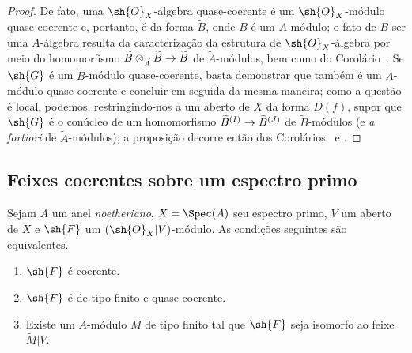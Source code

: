 \documentclass[oneside]{amsart}
\makeatletter
\newcommand{\ega@arrow}[2]{\mathchoice{#1}{#2}{#2}{#2}}
\renewcommand{\to}{\ega@arrow{\longrightarrow}{\rightarrow}}
\let\EGAOriginalLabel\label
\renewcommand{\label}[1]{\phantomsection\EGAOriginalLabel{#1}}
\makeatother
\begin{document}
\begin{proof}
De fato, uma $\sh{O}_X$-álgebra quase-coerente é um $\sh{O}_X$-módulo quase-coerente e, portanto, é da forma $\widetilde{B}$, onde $B$ é um $A$-módulo;
o fato de $B$ ser uma $A$-álgebra resulta da caracterização da estrutura de $\sh{O}_X$-álgebra por meio do homomorfismo $\widetilde{B}\otimes_{\widetilde{A}}\widetilde{B}\to\widetilde{B}$ de $\widetilde{A}$-módulos, bem como do Corolário~.
Se $\sh{G}$ é um $\widetilde{B}$-módulo quase-coerente, basta demonstrar que também é um $\widetilde{A}$-módulo quase-coerente e concluir em seguida da mesma maneira;
como a questão é local, podemos, restringindo-nos a um aberto de $X$ da forma $D(f)$, supor que $\sh{G}$ é o conúcleo de um homomorfismo $\widetilde{B}^{(I)}\to\widetilde{B}^{(J)}$ de $\widetilde{B}$-módulos (e \emph{a fortiori} de $\widetilde{A}$-módulos);
a proposição decorre então dos Corolários~ e .
\end{proof}

\subsection{Feixes coerentes sobre um espectro primo}
\label{subsection:I.1.5}

\begin{theorem}[1.5.1]
\label{I.1.5.1}
Sejam $A$ um anel \emph{noetheriano}, $X=\Spec(A)$ seu espectro primo, $V$ um aberto de $X$ e $\sh{F}$ um $(\sh{O}_X|V)$-módulo.
As condições seguintes são equivalentes.
\begin{enumerate}
  \item[{\rm(a)}] $\sh{F}$ é coerente.
  \item[{\rm(b)}] $\sh{F}$ é de tipo finito e quase-coerente.
  \item[{\rm(c)}] Existe um $A$-módulo $M$ de tipo finito tal que $\sh{F}$ seja isomorfo ao feixe $\widetilde{M}|V$.
\end{enumerate}
\end{theorem}
\end{document}
